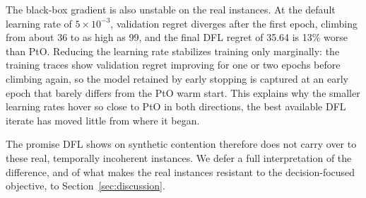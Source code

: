 The black-box gradient is also unstable on the real instances. At the default learning rate of $5\times10^{-3}$, validation regret diverges after the first epoch, climbing from about 36 to as high as 99, and the final DFL regret of 35.64 is 13\% worse than PtO. Reducing the learning rate stabilizes training only marginally: the training traces show validation regret improving for one or two epochs before climbing again, so the model retained by early stopping is captured at an early epoch that barely differs from the PtO warm start. This explains why the smaller learning rates hover so close to PtO in both directions, the best available DFL iterate has moved little from where it began.

The promise DFL shows on synthetic contention therefore does not carry over to these real, temporally incoherent instances. We defer a full interpretation of the difference, and of what makes the real instances resistant to the decision-focused objective, to Section~\ref{sec:discussion}.
